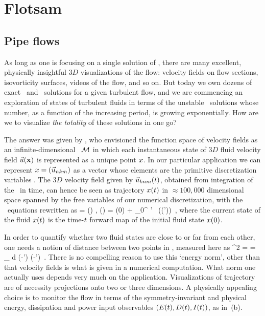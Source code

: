 
\section{Flotsam}
\label{s:flotsam}

\subsection{Pipe flows}
\label{s:review}

As long as one is focusing on a single solution of \NSe, there are many
excellent, physically insightful $3D$ visualizations of the flow:
velocity fields on flow sections, isovorticity surfaces, videos of the
flow, and so on. But today we own dozens of exact \eqv\ and \reqv\
solutions for a given turbulent flow, and we are commencing an exploration of
states of turbulent fluids in terms of the unstable \po\ solutions whose
number, as a function of the increasing period, is growing exponentially.
How are we to visualize \emph{the totality} of these solutions in one go?

The answer was given by \cite{hopf48}, who envisioned the function space
of {\NS} velocity fields as an infinite-dimensional \statesp\ ${\cal M}$ in
which each instantaneous state of $3D$ fluid velocity field $\vec{u}({\bf x})$ is
represented as a unique point $x$. In our particular application we
can represent $x = (\vec{u}_{nkm})$ as a vector whose elements are the
primitive discretization variables \refeq{pipeDiscr}. The $3D$ velocity
field given by $\vec{u}_{knm}(t)$, obtained from integration of the
\NSe\ in time, can hence be seen as trajectory $x(t)$ in
$\approx 100,000$ dimensional space spanned by the free variables of our
numerical discretization, with the \NS\ equations \refeq{NavStokesDev}
rewritten as
\beq
   \dot{\ssp} = \vel(\ssp) ,
   \qquad
   \ssp(\zeit) = \ssp(0)
            + \int_0^\zeit \! \zeit' \, \vel(\ssp(\zeit'))
\,,
where the current state of the fluid $ x(t)$ is the time-$t$
forward map of the initial fluid state  $x(0)$.

In order to quantify whether two fluid states are close to or far from
each other, one needs a notion of distance between two points in
\statesp, measured here as
\beq
  ^2  =  =
\int_\bCell \! d \bx \;
(-\vec{u}') \cdot (-')
\,.
There is no compelling reason to use this {`energy norm'}, other than
that velocity fields is what is given in a numerical computation. What
norm one actually uses depends very much on the application.
Visualizations of trajectory  are of necessity
projections onto two or three dimensions. A physically appealing choice
is to monitor the flow in terms of the
symmetry-invariant and physical energy, dissipation and power input
observables $(E(t),D(t),I(t))$, as in
\,(b).

